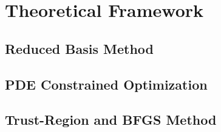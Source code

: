 \section{Theoretical Framework}

\subsection{Reduced Basis Method}


\subsection{PDE Constrained Optimization}


\subsection{Trust-Region and BFGS Method}

